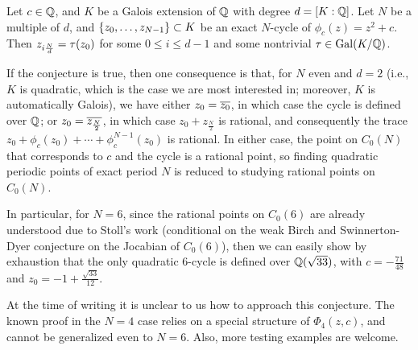 \begin{conjecture}
  Let $c \in \mathbb{Q}$, and $K$ be a Galois extension of $\mathbb{Q}$ with degree $d
  = [K : \mathbb{Q}]$. Let $N$ be a multiple of $d$, and $\left\{z_0, \dots,
    z_{N-1}\right\} \subset K$ be an exact $N$-cycle of $\phi_c(z) = z^2 +
  c$. Then $z_{i\frac{N}{d}} = \tau(z_0)$ for some $0 \le i \le d-1$ and some
  nontrivial $\tau \in \mathrm{Gal}(K/\mathbb{Q})$.
\end{conjecture}

If the conjecture is true, then one consequence is that, for $N$ even
and $d = 2$ (i.e., $K$ is quadratic, which is the case we are most
interested in; moreover, $K$ is automatically Galois), we have either
$z_0 = \overline{z_0}$, in which case the cycle is defined over $\mathbb{Q}$; or
$z_0 = \overline{z_{\frac{N}{2}}}$, in which case $z_0 + z_{\frac{N}{2}}$
is rational, and consequently the trace $z_0 + \phi_c(z_0) + \cdots +
\phi_c^{N-1}(z_0)$ is rational. In either case, the point on $C_0(N)$
that corresponds to $c$ and the cycle is a rational point, so finding
quadratic periodic points of exact period $N$ is reduced to studying
rational points on $C_0(N)$.

In particular, for $N = 6$, since the rational points on $C_0(6)$ are
already understood due to Stoll's work \cite{MR2465796} (conditional
on the weak Birch and Swinnerton-Dyer conjecture on the Jocabian of
$C_0(6)$), then we can easily show by exhaustion that the only
quadratic 6-cycle is defined over $\mathbb{Q}(\sqrt{33})$, with $c =
-\frac{71}{48}$ and $z_0 = -1 + \frac{\sqrt{33}}{12}$.

At the time of writing it is unclear to us how to approach this
conjecture. The known proof in the $N = 4$ case relies on a special
structure of $\Phi_4(z, c)$, and cannot be generalized even to $N =
6$. Also, more testing examples are welcome.

